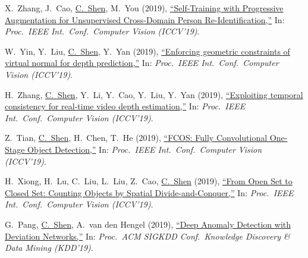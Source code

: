 \documentclass[9pt, a4paper]{article}
\newcommand{\years}[1]{\marginnote{\scriptsize #1}}
\def\highlight{\uline}
\begin{document}
\medskip

\years{2019} X.~Zhang, J.~Cao, \highlight{C.~Shen}, M.~You (2019),
\href{http://www.google.com/search?lr=&ie=UTF-8&oe=UTF-8&q=Self-Training+with+Progressive+Augmentation+for+Unsupervised+Cross-Domain+Person+Re-Identification+Xinyu+Zhang%2C+Jiewei+Cao%2C+Chunhua+Shen%2C+Mingyu+You}{``Self-Training with Progressive Augmentation for Unsupervised Cross-Domain Person Re-Identification,{}''}
In: \emph{Proc.\ IEEE Int.\ Conf.\  Computer Vision (ICCV'19)}.

\medskip

\years{2019} W.~Yin, Y.~Liu, \highlight{C.~Shen}, Y.~Yan (2019),
\href{http://www.google.com/search?lr=&ie=UTF-8&oe=UTF-8&q=Enforcing+geometric+constraints+of+virtual+normal+for+depth+prediction+Wei+Yin%2C+Yifan+Liu%2C+Chunhua+Shen%2C+Youliang+Yan}{``Enforcing geometric constraints of virtual normal for depth prediction,{}''}
In: \emph{Proc.\ IEEE Int.\ Conf.\  Computer Vision (ICCV'19)}.

\medskip

\years{2019} H.~Zhang, \highlight{C.~Shen}, Y.~Li, Y.~Cao, Y.~Liu, Y.~Yan (2019),
\href{http://www.google.com/search?lr=&ie=UTF-8&oe=UTF-8&q=Exploiting+temporal+consistency+for+real-time+video+depth+estimation+Haokui+Zhang%2C+Chunhua+Shen%2C+Ying+Li%2C+Yuanzhouhan+Cao%2C+Yu+Liu%2C+Youliang+Yan}{``Exploiting temporal consistency for real-time video depth estimation,{}''}
In: \emph{Proc.\ IEEE Int.\ Conf.\  Computer Vision (ICCV'19)}.

\medskip

\years{2019} Z.~Tian, \highlight{C.~Shen}, H.~Chen, T.~He (2019),
\href{http://www.google.com/search?lr=&ie=UTF-8&oe=UTF-8&q=FCOS%3A+Fully+Convolutional+One-Stage+Object+Detection+Zhi+Tian%2C+Chunhua+Shen%2C+Hao+Chen%2C+Tong+He}{``{FCOS}: Fully Convolutional One-Stage Object Detection,{}''}
In: \emph{Proc.\ IEEE Int.\ Conf.\  Computer Vision (ICCV'19)}.

\medskip

\years{2019} H.~Xiong, H.~Lu, C.~Liu, L.~Liu, Z.~Cao, \highlight{C.~Shen} (2019),
\href{http://www.google.com/search?lr=&ie=UTF-8&oe=UTF-8&q=From+Open+Set+to+Closed+Set%3A+Counting+Objects+by+Spatial+Divide-and-Conquer+Haipeng+Xiong%2C+Hao+Lu%2C+Chengxin+Liu%2C+Liang+Liu%2C+Zhiguo+Cao%2C+Chunhua+Shen}{``From Open Set to Closed Set: Counting Objects by Spatial Divide-and-Conquer,{}''}
In: \emph{Proc.\ IEEE Int.\ Conf.\  Computer Vision (ICCV'19)}.

\medskip

\years{2019} G.~Pang, \highlight{C.~Shen}, A.~van den Hengel (2019),
\href{http://www.google.com/search?lr=&ie=UTF-8&oe=UTF-8&q=Deep+Anomaly+Detection+with+Deviation+Networks+Guansong+Pang%2C+Chunhua+Shen%2C+Anton+van+den+Hengel}{``Deep Anomaly Detection with Deviation Networks,{}''}
In: \emph{Proc.\ ACM SIGKDD Conf.\  Knowledge Discovery \& Data Mining (KDD'19)}.
\end{document}

